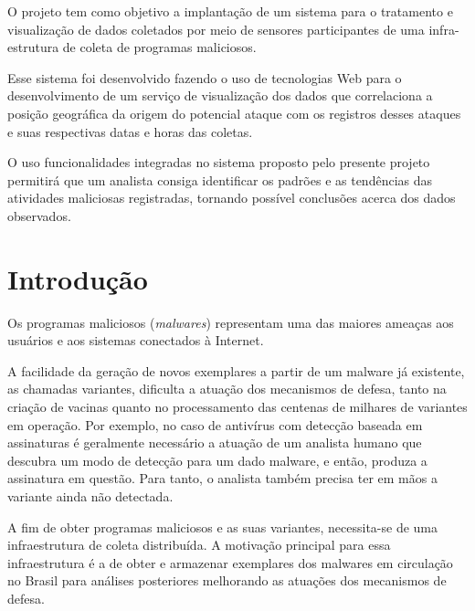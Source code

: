 \documentclass[Portuguese]
{ic-tese-v2}
\begin{document}
\author{Alexandre Or Cansian Baruque}


\beforepreface

\begin{oresumo}
O projeto tem como objetivo a implantação de um sistema para o tratamento e visualização de dados coletados por meio de sensores participantes de uma infra-estrutura de coleta de programas maliciosos.

Esse sistema foi desenvolvido fazendo o uso de tecnologias Web para o desenvolvimento de um serviço de visualização dos dados que correlaciona a posição geográfica da origem do potencial ataque com os registros desses ataques e suas respectivas datas e horas das coletas.

O uso funcionalidades integradas no sistema proposto pelo presente projeto permitirá que um analista consiga identificar os padrões e as tendências das atividades maliciosas registradas, tornando possível conclusões acerca dos dados observados.
\end{oresumo}

\afterpreface   


\chapter{Introdução}
Os programas maliciosos (\emph{malwares}) representam uma das maiores ameaças aos usuários e aos sistemas conectados à Internet. 

A facilidade da geração de novos exemplares a partir de um malware já existente, as chamadas variantes, dificulta a atuação dos mecanismos de defesa, tanto na criação de vacinas quanto no processamento das centenas de milhares de variantes em operação. Por exemplo, no caso de antivírus com detecção baseada em assinaturas é geralmente necessário a atuação de um analista humano que descubra um modo de detecção para um dado malware, e  então, produza a assinatura em questão. Para tanto, o analista também precisa ter em mãos a variante ainda não detectada.

A fim de obter programas maliciosos e as suas variantes, necessita-se de uma infraestrutura de coleta distribuída. A motivação principal para essa infraestrutura é a de obter e armazenar exemplares dos malwares em circulação no Brasil para análises posteriores melhorando as atuações dos mecanismos de defesa. 
\end{document}

